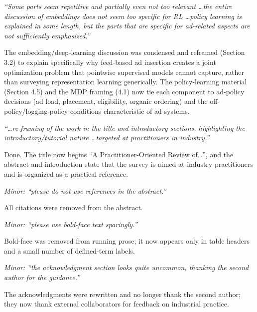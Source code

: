 \documentclass[11pt]{article}
\newenvironment{revcomment}
  {\par\smallskip\noindent\begin{list}{}{%
      \setlength{\leftmargin}{1.5em}\setlength{\rightmargin}{1em}}%
   \item\itshape\color{black!75}}
  {\end{list}\par\smallskip}
\begin{document}
\begin{revcomment}
``Some parts seem repetitive and partially even not too relevant \dots the
entire discussion of embeddings does not seem too specific for RL \dots policy
learning is explained in some length, but the parts that are specific for
ad-related aspects are not sufficiently emphasized.''
\end{revcomment}

The embedding/deep-learning discussion was condensed and reframed (Section 3.2)
to explain specifically why feed-based ad insertion creates a joint
optimization problem that pointwise supervised models cannot capture, rather
than surveying representation learning generically. The policy-learning
material (Section 4.5) and the MDP framing (4.1) now tie each component to
ad-policy decisions (ad load, placement, eligibility, organic ordering) and the
off-policy/logging-policy conditions characteristic of ad systems.

\begin{revcomment}
``\dots re-framing of the work in the title and introductory sections,
highlighting the introductory/tutorial nature \dots targeted at practitioners
in industry.''
\end{revcomment}

Done. The title now begins ``A Practitioner-Oriented Review of\dots'', and the
abstract and introduction state that the survey is aimed at industry
practitioners and is organized as a practical reference.

\begin{revcomment}
Minor: ``please do not use references in the abstract.''
\end{revcomment}

All citations were removed from the abstract.

\begin{revcomment}
Minor: ``please use bold-face text sparingly.''
\end{revcomment}

Bold-face was removed from running prose; it now appears only in table headers
and a small number of defined-term labels.

\begin{revcomment}
Minor: ``the acknowledgment section looks quite uncommon, thanking the second
author for the guidance.''
\end{revcomment}

The acknowledgments were rewritten and no longer thank the second author; they
now thank external collaborators for feedback on industrial practice.
\end{document}
